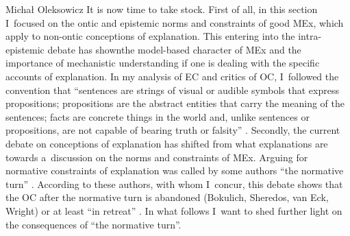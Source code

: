 \begin{artengenv}{Michał Oleksowicz}
It is now time to take stock. First of all, in this section I~focused on the ontic and epistemic norms and constraints of good MEx, which apply to non-ontic conceptions of explanation. This entering into the intra-epistemic debate has shownthe model-based character of MEx and the importance of mechanistic understanding if one is dealing with the specific accounts of explanation. In my analysis of EC and critics of OC, I~followed the convention that ``sentences are strings of visual or audible symbols that express propositions; propositions are the abstract entities that carry the meaning of the sentences; facts are concrete things in the world and, unlike sentences or propositions, are not capable of bearing truth or falsity''
\parencite[][p.148]{khalifa_understanding_2017}. %
 Secondly, the current debate on conceptions of explanation has shifted from what explanations are towards a~discussion on the norms and constraints of MEx. Arguing for normative constraints of explanation was called by some authors ``the normative turn'' 
\parencites[][p.921]{sheredos_re-reconciling_2016}[][p.1023]{wright_ontic_2018}. %
 According to these authors, with whom I~concur, this debate shows that the OC after the normative turn is abandoned (Bokulich, Sheredos, van Eck, Wright) or at least ``in retreat'' 
\parencite[][]{potochnik_eight_2018}. %
 In what follows I~want to shed further light on the consequences of ``the normative turn''.






\begin{table}[H]
\end{table}
\end{artengenv}

